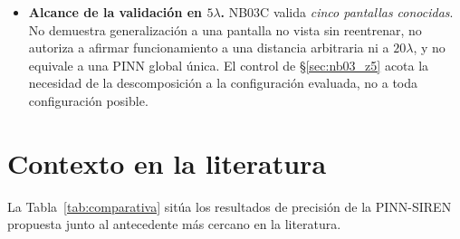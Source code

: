 \begin{itemize}
    \item \textbf{Alcance de la validación en $5\lambda$.} NB03C valida
    \emph{cinco pantallas conocidas}. No demuestra generalización a una pantalla
    no vista sin reentrenar, no autoriza a afirmar funcionamiento a una
    distancia arbitraria ni a $20\lambda$, y no equivale a una PINN global
    única. El control de §\ref{sec:nb03_z5} acota la necesidad de la
    descomposición a la configuración evaluada, no a toda configuración
    posible.
\end{itemize}

\section{Contexto en la literatura}

La Tabla~\ref{tab:comparativa} sitúa los resultados de precisión de la
PINN-SIREN propuesta junto al antecedente más cercano en la literatura.

